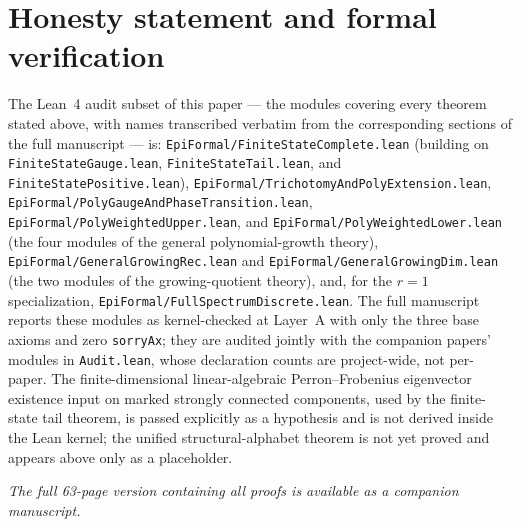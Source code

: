 \section*{Honesty statement and formal verification}

The Lean~4 audit subset of this paper --- the modules covering every theorem
stated above, with names transcribed verbatim from the corresponding sections
of the full manuscript --- is: \texttt{EpiFormal/FiniteStateComplete.lean}
(building on \texttt{FiniteStateGauge.lean}, \texttt{FiniteStateTail.lean},
and \texttt{FiniteStatePositive.lean}), \texttt{EpiFormal/TrichotomyAndPolyExtension.lean},
\texttt{EpiFormal/PolyGaugeAndPhaseTransition.lean},
\texttt{EpiFormal/PolyWeightedUpper.lean}, and
\texttt{EpiFormal/PolyWeightedLower.lean} (the four modules of the general
polynomial-growth theory), \texttt{EpiFormal/GeneralGrowingRec.lean} and
\texttt{EpiFormal/GeneralGrowingDim.lean} (the two modules of the
growing-quotient theory), and, for the $r=1$ specialization,
\texttt{EpiFormal/FullSpectrumDiscrete.lean}. The full manuscript reports
these modules as kernel-checked at Layer~A with only the three base axioms and
zero \texttt{sorryAx}; they are audited jointly with the companion papers'
modules in \texttt{Audit.lean}, whose declaration counts are project-wide, not
per-paper. The finite-dimensional linear-algebraic Perron--Frobenius
eigenvector existence input on marked strongly connected components, used by
the finite-state tail theorem, is passed explicitly as a hypothesis and is not
derived inside the Lean kernel; the unified structural-alphabet theorem is not
yet proved and appears above only as a placeholder.

\emph{The full 63-page version containing all proofs is available as a companion manuscript.}
